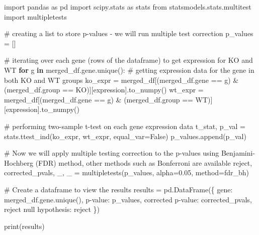 \documentclass[
  letterpaper,
  DIV=11,
  numbers=noendperiod]{scrartcl}
\newenvironment{Shaded}{\begin{snugshade}}{\end{snugshade}}
\newcommand{\BuiltInTok}[1]{\textcolor[rgb]{0.00,0.23,0.31}{#1}}
\newcommand{\CommentTok}[1]{\textcolor[rgb]{0.37,0.37,0.37}{#1}}
\newcommand{\ControlFlowTok}[1]{\textcolor[rgb]{0.00,0.23,0.31}{\textbf{#1}}}
\newcommand{\FloatTok}[1]{\textcolor[rgb]{0.68,0.00,0.00}{#1}}
\newcommand{\ImportTok}[1]{\textcolor[rgb]{0.00,0.46,0.62}{#1}}
\newcommand{\KeywordTok}[1]{\textcolor[rgb]{0.00,0.23,0.31}{\textbf{#1}}}
\newcommand{\NormalTok}[1]{\textcolor[rgb]{0.00,0.23,0.31}{#1}}
\newcommand{\OperatorTok}[1]{\textcolor[rgb]{0.37,0.37,0.37}{#1}}
\newcommand{\StringTok}[1]{\textcolor[rgb]{0.13,0.47,0.30}{#1}}
\newcommand{\VariableTok}[1]{\textcolor[rgb]{0.07,0.07,0.07}{#1}}
\begin{document}
\begin{Shaded}
\begin{Highlighting}[]
\ImportTok{import}\NormalTok{ pandas }\ImportTok{as}\NormalTok{ pd}
\ImportTok{import}\NormalTok{ scipy.stats }\ImportTok{as}\NormalTok{ stats}
\ImportTok{from}\NormalTok{ statsmodels.stats.multitest }\ImportTok{import}\NormalTok{ multipletests}


\CommentTok{\# creating a list to store p{-}values {-} we will run multiple test correction}
\NormalTok{p\_values }\OperatorTok{=}\NormalTok{ []}

\CommentTok{\# iterating over each gene (rows of the dataframe) to get expression for KO and WT}
\ControlFlowTok{for}\NormalTok{ g }\KeywordTok{in}\NormalTok{ merged\_df.gene.unique():}
    \CommentTok{\# getting expression data for the gene in both KO and WT groups}
\NormalTok{    ko\_expr }\OperatorTok{=}\NormalTok{ merged\_df[(merged\_df.gene }\OperatorTok{==}\NormalTok{ g) }\OperatorTok{\&}\NormalTok{ (merged\_df.group }\OperatorTok{==} \StringTok{\textquotesingle{}KO\textquotesingle{}}\NormalTok{)][}\StringTok{\textquotesingle{}expression\textquotesingle{}}\NormalTok{].to\_numpy()}
\NormalTok{    wt\_expr }\OperatorTok{=}\NormalTok{ merged\_df[(merged\_df.gene }\OperatorTok{==}\NormalTok{ g) }\OperatorTok{\&}\NormalTok{ (merged\_df.group }\OperatorTok{==} \StringTok{\textquotesingle{}WT\textquotesingle{}}\NormalTok{)][}\StringTok{\textquotesingle{}expression\textquotesingle{}}\NormalTok{].to\_numpy()}

    \CommentTok{\# performing two{-}sample t{-}test on each gene expression data}
\NormalTok{    t\_stat, p\_val }\OperatorTok{=}\NormalTok{ stats.ttest\_ind(ko\_expr, wt\_expr, equal\_var}\OperatorTok{=}\VariableTok{False}\NormalTok{)}
\NormalTok{    p\_values.append(p\_val)}

\CommentTok{\# Now we will apply multiple testing correction to the p{-}values using Benjamini{-}Hochberg (FDR) method, other methods such as Bonferroni are available}
\NormalTok{reject, corrected\_pvals, \_, \_ }\OperatorTok{=}\NormalTok{ multipletests(p\_values, alpha}\OperatorTok{=}\FloatTok{0.05}\NormalTok{, method}\OperatorTok{=}\StringTok{\textquotesingle{}fdr\_bh\textquotesingle{}}\NormalTok{)}

\CommentTok{\# Create a dataframe to view the results}
\NormalTok{results }\OperatorTok{=}\NormalTok{ pd.DataFrame(\{}
    \StringTok{\textquotesingle{}gene\textquotesingle{}}\NormalTok{: merged\_df.gene.unique(),}
    \StringTok{\textquotesingle{}p{-}value\textquotesingle{}}\NormalTok{: p\_values,}
    \StringTok{\textquotesingle{}corrected p{-}value\textquotesingle{}}\NormalTok{: corrected\_pvals,}
    \StringTok{\textquotesingle{}reject null hypothesis\textquotesingle{}}\NormalTok{: reject}
\NormalTok{\})}

\BuiltInTok{print}\NormalTok{(results)}
\end{Highlighting}
\end{Shaded}
\end{document}
